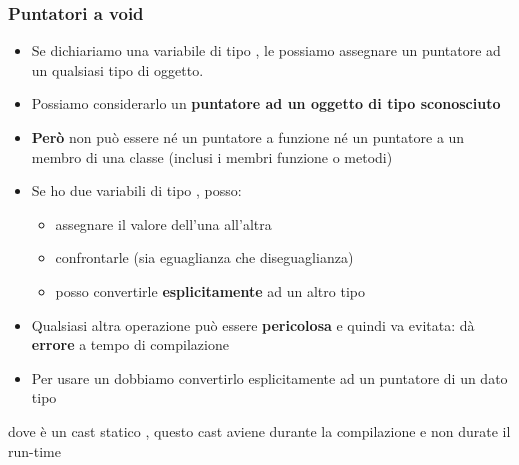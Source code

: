 \subsubsection{Puntatori a void}
\begin{itemize}
    \item Se dichiariamo una variabile di tipo , le possiamo
    assegnare un puntatore ad un qualsiasi tipo di oggetto.
    \item Possiamo considerarlo un \textbf{puntatore ad un oggetto di
    tipo sconosciuto}
    \item \textbf{Però} non può essere né un puntatore a funzione né un
    puntatore a un membro di una classe (inclusi i membri
    funzione o metodi)
    \item Se ho due variabili di tipo , posso:
    \begin{itemize}
        \item assegnare il valore dell’una all’altra
        \item confrontarle (sia eguaglianza che diseguaglianza)
        \item posso convertirle \textbf{esplicitamente} ad un altro tipo \end{itemize}
    \item Qualsiasi altra operazione può essere \textbf{pericolosa} e quindi
    va evitata: dà \textbf{errore} a tempo di compilazione
    \item Per usare un  dobbiamo convertirlo esplicitamente
    ad un puntatore di un dato tipo
    
\end{itemize}
\newline dove  è un cast statico , questo cast aviene durante la compilazione e non durate il run-time
